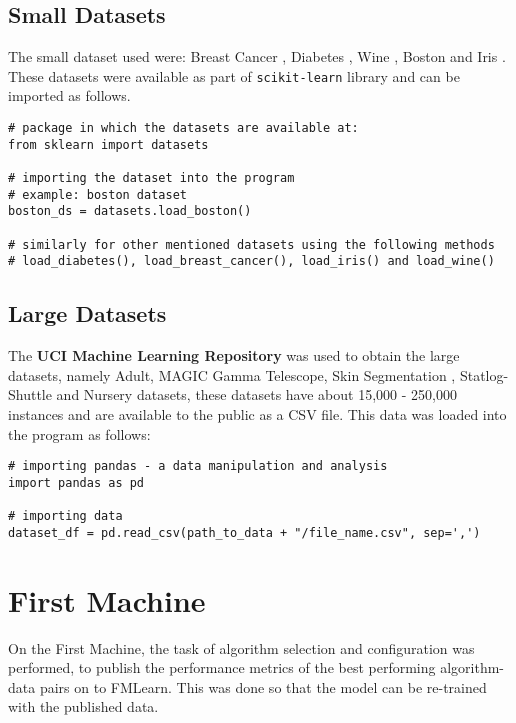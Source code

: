 \subsection*{Small Datasets}

The small dataset used were: Breast Cancer \citep{brendan-et-al}, Diabetes \citep{bradley-et-al}, Wine \citep{lichman:m}, Boston \citep{harrison-et-al} and Iris \citep{fisher:r}. These datasets were available as part of \texttt{scikit-learn} library and can be imported as follows.

\begin{lstlisting}
# package in which the datasets are available at:
from sklearn import datasets

# importing the dataset into the program
# example: boston dataset
boston_ds = datasets.load_boston()

# similarly for other mentioned datasets using the following methods
# load_diabetes(), load_breast_cancer(), load_iris() and load_wine()

\end{lstlisting}

\subsection*{Large Datasets}

The \textbf{UCI Machine Learning Repository} \citep{Dua:2019} was used to obtain the large datasets, namely Adult, MAGIC Gamma Telescope, Skin Segmentation \citep{skin-ds}, Statlog-Shuttle and Nursery \citep{Dua:2019} datasets, these datasets have about 15,000 - 250,000 instances and are available to the public as a CSV file. This data was loaded into the program as follows:

\begin{lstlisting}
# importing pandas - a data manipulation and analysis
import pandas as pd

# importing data
dataset_df = pd.read_csv(path_to_data + "/file_name.csv", sep=',')

\end{lstlisting}

\section*{First Machine}

On the First Machine, the task of algorithm selection and configuration was performed, to publish the performance metrics of the best performing algorithm-data pairs on to FMLearn. This was done so that the model can be re-trained with the published data.

